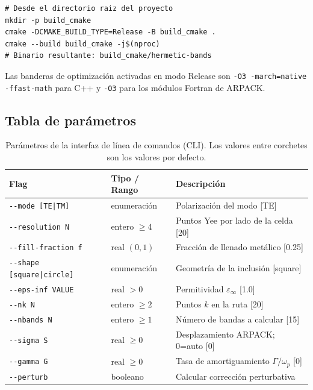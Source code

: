\documentclass[12pt,a4paper]{article}
\newcommand{\omegap}{\omega_p}
\newcommand{\epsinf}{\varepsilon_\infty}
\begin{document}
\begin{lstlisting}[style=bash, caption={Compilación en modo Release (recomendado)}]
# Desde el directorio raiz del proyecto
mkdir -p build_cmake
cmake -DCMAKE_BUILD_TYPE=Release -B build_cmake .
cmake --build build_cmake -j$(nproc)
# Binario resultante: build_cmake/hermetic-bands
\end{lstlisting}

Las banderas de optimización activadas en modo Release son
\texttt{-O3 -march=native -ffast-math} para C++ y
\texttt{-O3} para los módulos Fortran de ARPACK.

\subsection{Tabla de parámetros}

\begin{table}[htbp]
  \centering
  \caption{Parámetros de la interfaz de línea de comandos (CLI).
    Los valores entre corchetes son los valores por defecto.}
  \label{tab:cli}
  \small
  \begin{tabular}{@{}lll@{}}
    \toprule
    \textbf{Flag} & \textbf{Tipo / Rango} & \textbf{Descripción} \\
    \midrule
    \texttt{-{}-mode [TE|TM]}          & enumeración     & Polarización del modo [TE] \\
    \texttt{-{}-resolution N}          & entero $\geq 4$ & Puntos Yee por lado de la celda [20] \\
    \texttt{-{}-fill-fraction f}       & real $(0,1)$    & Fracción de llenado metálico [0.25] \\
    \texttt{-{}-shape [square|circle]} & enumeración     & Geometría de la inclusión [square] \\
    \texttt{-{}-eps-inf VALUE}         & real $>0$       & Permitividad $\epsinf$ [1.0] \\
    \texttt{-{}-nk N}                  & entero $\geq 2$ & Puntos $k$ en la ruta [20] \\
    \texttt{-{}-nbands N}              & entero $\geq 1$ & Número de bandas a calcular [15] \\
    \texttt{-{}-sigma S}               & real $\geq 0$   & Desplazamiento ARPACK; 0=auto [0] \\
    \texttt{-{}-gamma G}               & real $\geq 0$   & Tasa de amortiguamiento $\Gamma/\omegap$ [0] \\
    \texttt{-{}-perturb}               & booleano        & Calcular corrección perturbativa \\

\end{tabular}
\end{table}
\end{document}
